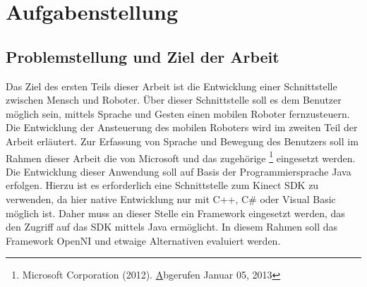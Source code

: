 \chapter{Aufgabenstellung}
\label{chap:Aufgabenstellung}

\section{Problemstellung und Ziel der Arbeit}


%

%
Das Ziel des ersten Teils dieser Arbeit ist die Entwicklung einer Schnittstelle zwischen Mensch und Roboter.
Über dieser Schnittstelle soll es dem Benutzer m\"oglich sein, mittels Sprache und Gesten einen mobilen Roboter fernzusteuern. Die Entwicklung der Ansteuerung des mobilen Roboters wird im zweiten Teil der Arbeit erl\"autert.
\newline
Zur Erfassung von Sprache und Bewegung des Benutzers soll im Rahmen dieser Arbeit die \textit{} von Microsoft und das zugehörige \textit{} \footnote{Microsoft Corporation (2012). \href{http://www.microsoft.com/en-us/kinectforwindows/} Abgerufen Januar 05, 2013} eingesetzt werden. 
Die Entwicklung dieser Anwendung soll auf Basis der Programmiersprache Java erfolgen.
Hierzu ist es erforderlich eine Schnittstelle zum Kinect SDK zu verwenden, da hier native Entwicklung nur mit C++, C# oder Visual Basic möglich ist.
Daher muss an dieser Stelle ein Framework eingesetzt werden, das den Zugriff auf das SDK mittels Java ermöglicht.
In diesem Rahmen soll das Framework OpenNI und etwaige Alternativen evaluiert werden.


